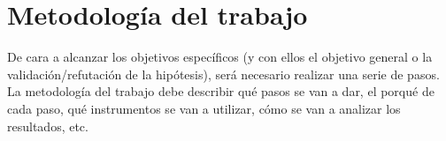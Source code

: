 \section{Metodología del trabajo}

De cara a alcanzar los objetivos específicos (y con ellos el objetivo general o la validación/refutación de la hipótesis), será necesario realizar una serie de pasos. La metodología del trabajo debe describir qué pasos se van a dar, el porqué de cada paso, qué instrumentos se van a utilizar, cómo se van a analizar los resultados, etc.